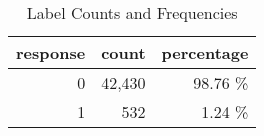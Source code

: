 \begin{table}[H]
\centering
\caption{Label Counts and Frequencies}
\label{tab:label-counts-freqs}
\begin{tabular}{rrr}
\toprule
response & count & percentage \\
\midrule
0 & 42,430 & 98.76 \% \\
1 & 532 & 1.24 \% \\
\bottomrule
\end{tabular}
\end{table}
